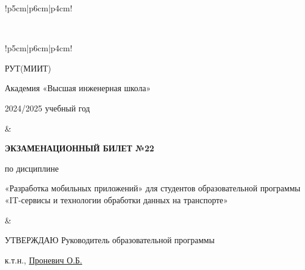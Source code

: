 \documentclass[a4paper]{article}
\begin{document}
\begin{tabular}{!{\vrule width 2pt}p{5cm}|p{6cm}|p{4cm}!{\vrule width 2pt}}
{\begin{minipage}{16cm}
\vspace{0.2cm}
    
\end{minipage}
}
\\
\end{tabular}

\newpage


\begin{tabular}{!{\vrule width 2pt}p{5cm}|p{6cm}|p{4cm}!{\vrule width 2pt}}

    {\centering 
    \fontsize{14pt}{16pt}\selectfont
    РУТ(МИИТ)

\vspace{14pt}

Академия «Высшая инженерная школа»

\vspace{14pt}

2024/2025 учебный год

    }
&
{
    \centering
\fontsize{14pt}{16pt}\selectfont

\textbf{ЭКЗАМЕНАЦИОННЫЙ
БИЛЕТ №22}


по дисциплине 

«Разработка мобильных приложений» 
\fontsize{12pt}{14pt}\selectfont
для студентов образовательной программы «IT-сервисы и технологии обработки данных на транспорте»

}
&
{
\centering
\fontsize{14pt}{16pt}\selectfont

УТВЕРЖДАЮ
Руководитель образовательной программы

\vspace{1cm}

\fontsize{12pt}{14pt}\selectfont
\underline{\hspace{3cm}}

к.т.н., \underline{Проневич О.Б.}

}
\\
\hline
{}
\end{tabular}
\end{document}
